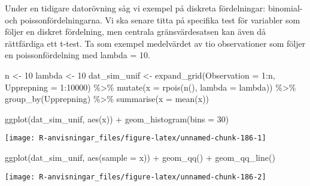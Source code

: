 \documentclass[
]{book}
\newenvironment{Shaded}{\begin{snugshade}}{\end{snugshade}}
\newcommand{\AttributeTok}[1]{\textcolor[rgb]{0.77,0.63,0.00}{#1}}
\newcommand{\DecValTok}[1]{\textcolor[rgb]{0.00,0.00,0.81}{#1}}
\newcommand{\FunctionTok}[1]{\textcolor[rgb]{0.00,0.00,0.00}{#1}}
\newcommand{\NormalTok}[1]{#1}
\newcommand{\OtherTok}[1]{\textcolor[rgb]{0.56,0.35,0.01}{#1}}
\newcommand{\SpecialCharTok}[1]{\textcolor[rgb]{0.00,0.00,0.00}{#1}}
\theoremstyle{definition}
\theoremstyle{definition}
\theoremstyle{definition}
\theoremstyle{definition}
\theoremstyle{remark}
\begin{document}
Under en tidigare datorövning såg vi exempel på diskreta fördelningar: binomial- och poissonfördelningarna. Vi ska senare titta på specifika test för variabler som följer en diskret fördelning, men centrala gränsvärdesatsen kan även då rättfärdiga ett t-test. Ta som exempel medelvärdet av tio observationer som följer en poissonfördelning med lambda = 10.

\begin{Shaded}
\begin{Highlighting}[]
\NormalTok{n }\OtherTok{\textless{}{-}} \DecValTok{10}
\NormalTok{lambda }\OtherTok{\textless{}{-}} \DecValTok{10}
\NormalTok{dat\_sim\_unif }\OtherTok{\textless{}{-}} \FunctionTok{expand\_grid}\NormalTok{(}\AttributeTok{Observation =} \DecValTok{1}\SpecialCharTok{:}\NormalTok{n, }\AttributeTok{Upprepning =} \DecValTok{1}\SpecialCharTok{:}\DecValTok{10000}\NormalTok{) }\SpecialCharTok{\%\textgreater{}\%} 
  \FunctionTok{mutate}\NormalTok{(}\AttributeTok{x =} \FunctionTok{rpois}\NormalTok{(}\FunctionTok{n}\NormalTok{(), }\AttributeTok{lambda =}\NormalTok{ lambda)) }\SpecialCharTok{\%\textgreater{}\%} 
  \FunctionTok{group\_by}\NormalTok{(Upprepning) }\SpecialCharTok{\%\textgreater{}\%} 
  \FunctionTok{summarise}\NormalTok{(}\AttributeTok{x =} \FunctionTok{mean}\NormalTok{(x))}

\FunctionTok{ggplot}\NormalTok{(dat\_sim\_unif, }\FunctionTok{aes}\NormalTok{(x)) }\SpecialCharTok{+} \FunctionTok{geom\_histogram}\NormalTok{(}\AttributeTok{bins =} \DecValTok{30}\NormalTok{)}
\end{Highlighting}
\end{Shaded}

\begin{center}\texttt{[image: R-anvisningar\_files/figure-latex/unnamed-chunk-186-1]} \end{center}

\begin{Shaded}
\begin{Highlighting}[]
\FunctionTok{ggplot}\NormalTok{(dat\_sim\_unif, }\FunctionTok{aes}\NormalTok{(}\AttributeTok{sample =}\NormalTok{ x)) }\SpecialCharTok{+} \FunctionTok{geom\_qq}\NormalTok{() }\SpecialCharTok{+} \FunctionTok{geom\_qq\_line}\NormalTok{()}
\end{Highlighting}
\end{Shaded}

\begin{center}\texttt{[image: R-anvisningar\_files/figure-latex/unnamed-chunk-186-2]} \end{center}
\end{document}
